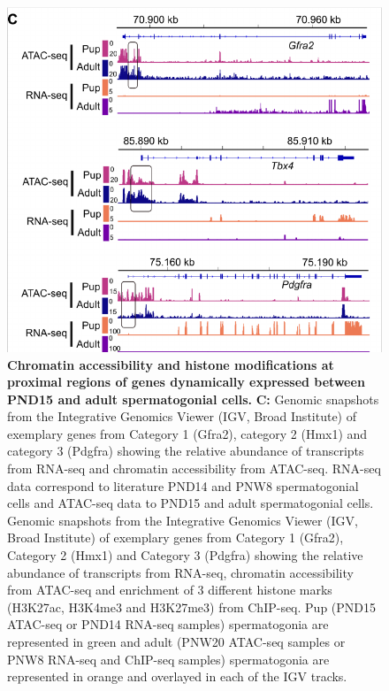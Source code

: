 \documentclass[12pt,twoside]{reedthesis}
\begin{document}
\begin{subfigures}
\begin{figure}[htbp]

{\centering \includegraphics{thesis_files/figure-latex/df3b-1} 

}

\caption[Chromatin accessibility and histone modifications at proximal regions of genes dynamically expressed between PND15 and adult spermatogonial cells]{\textbf{Chromatin accessibility and histone modifications at proximal regions of genes dynamically expressed between PND15 and adult spermatogonial cells.} \newline \textbf{C:} Genomic snapshots from the Integrative Genomics Viewer (IGV, Broad Institute) of exemplary genes from Category 1 (Gfra2), category 2 (Hmx1) and category 3 (Pdgfra) showing the relative abundance of transcripts from RNA-seq and chromatin accessibility from ATAC-seq. RNA-seq data correspond to literature PND14 and PNW8 spermatogonial cells and ATAC-seq data to PND15 and adult spermatogonial cells. Genomic snapshots from the Integrative Genomics Viewer (IGV, Broad Institute) of exemplary genes from Category 1 (Gfra2), Category 2 (Hmx1) and Category 3 (Pdgfra) showing the relative abundance of transcripts from RNA-seq, chromatin accessibility from ATAC-seq and enrichment of 3 different histone marks (H3K27ac, H3K4me3 and H3K27me3) from ChIP-seq. Pup (PND15 ATAC-seq or PND14 RNA-seq samples) spermatogonia are represented in green and adult (PNW20 ATAC-seq samples or PNW8 RNA-seq and ChIP-seq samples) spermatogonia are represented in orange and overlayed in each of the IGV tracks.}\label{fig:df3b}
\end{figure}
\end{subfigures}
\end{document}
